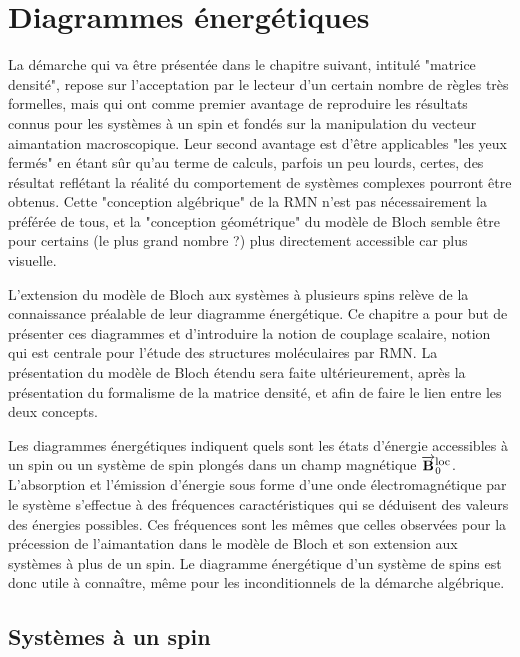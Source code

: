 \chapter{Diagrammes énergétiques}
\label{chap:diagram}

La démarche qui va être présentée dans le chapitre suivant,
intitulé "matrice densité", repose
sur l'acceptation par le lecteur d'un certain nombre de règles
très formelles, mais qui ont comme premier avantage de reproduire
les résultats connus pour les systèmes à un spin et fondés sur
la manipulation du vecteur aimantation macroscopique.
Leur second avantage est d'être applicables "les yeux fermés"
en étant sûr qu'au terme de calculs, parfois un peu lourds, certes,
des résultat reflétant la réalité du comportement de systèmes complexes
pourront être obtenus.
Cette "conception algébrique" de la RMN n'est pas nécessairement la préférée de tous,
et la "conception géométrique" du modèle de Bloch semble être pour certains
(le plus grand nombre ?) plus directement accessible car plus visuelle.

L'extension du modèle de Bloch aux systèmes à plusieurs spins relève 
de la connaissance préalable de leur diagramme énergétique.
Ce chapitre a pour but de présenter ces diagrammes
et d'introduire la notion de couplage scalaire, notion qui est centrale
pour l'étude des structures moléculaires par RMN.
La présentation du modèle de Bloch étendu sera faite ultérieurement,
après la présentation du formalisme de la matrice densité, et afin
de faire le lien entre les deux concepts. 

Les diagrammes énergétiques indiquent quels sont les états d'énergie accessibles
à un spin ou un système de spin plongés dans un champ magnétique $\overrightarrow{\mathbf{B}}_0^{\mbox{\footnotesize{loc}}}$.
L'absorption et l'émission d'énergie sous forme d'une onde électromagnétique
par le système s'effectue à des fréquences caractéristiques qui se déduisent
des valeurs des énergies possibles. 
Ces fréquences sont les mêmes que celles observées pour la précession de l'aimantation
dans le modèle de Bloch et son extension aux systèmes à plus de un spin.
Le diagramme énergétique d'un système de spins est donc utile à connaître,
même pour les inconditionnels de la démarche algébrique.

\section{Systèmes à un spin}


